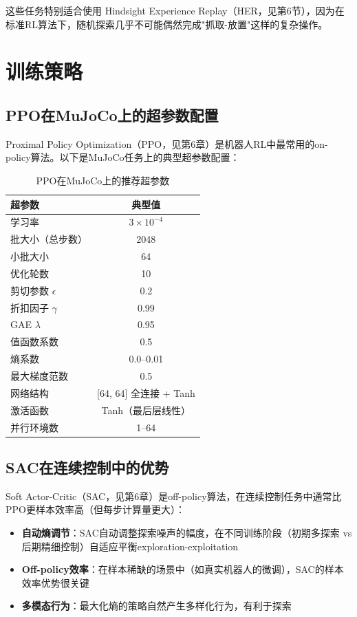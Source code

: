 这些任务特别适合使用 Hindsight Experience Replay（HER，见第6节），因为在标准RL算法下，随机探索几乎不可能偶然完成"抓取-放置"这样的复杂操作。

\section{训练策略}

\subsection{PPO在MuJoCo上的超参数配置}

Proximal Policy Optimization（PPO，见第6章）是机器人RL中最常用的on-policy算法。以下是MuJoCo任务上的典型超参数配置：

\begin{table}[htbp]
\centering
\caption{PPO在MuJoCo上的推荐超参数}
\label{tab:ppo_hp}
\begin{tabular}{lc}
\toprule
超参数 & 典型值 \\
\midrule
学习率 & $3 \times 10^{-4}$ \\
批大小（总步数） & 2048 \\
小批大小 & 64 \\
优化轮数 & 10 \\
剪切参数 $\epsilon$ & 0.2 \\
折扣因子 $\gamma$ & 0.99 \\
GAE $\lambda$ & 0.95 \\
值函数系数 & 0.5 \\
熵系数 & 0.0--0.01 \\
最大梯度范数 & 0.5 \\
网络结构 & [64, 64] 全连接 + Tanh \\
激活函数 & Tanh（最后层线性） \\
并行环境数 & 1--64 \\
\bottomrule
\end{tabular}
\end{table}

\subsection{SAC在连续控制中的优势}

Soft Actor-Critic（SAC，见第6章）是off-policy算法，在连续控制任务中通常比PPO更样本效率高（但每步计算量更大）：

\begin{itemize}
    \item \textbf{自动熵调节}：SAC自动调整探索噪声的幅度，在不同训练阶段（初期多探索 vs 后期精细控制）自适应平衡exploration-exploitation
    \item \textbf{Off-policy效率}：在样本稀缺的场景中（如真实机器人的微调），SAC的样本效率优势很关键
    \item \textbf{多模态行为}：最大化熵的策略自然产生多样化行为，有利于探索
\end{itemize}

